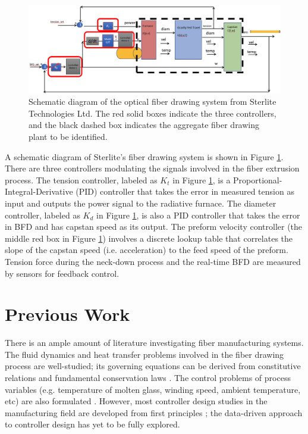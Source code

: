 \begin{figure}[ht!]
    \centering
    \includegraphics[width=\textwidth]{figures/stl_system_diag.png}
    \caption{Schematic diagram of the optical fiber drawing system from Sterlite Technologies Ltd. The red solid boxes indicate the three controllers, and the black dashed box indicates the aggregate fiber drawing plant to be identified.}
    \label{fig:stl_system_diag}
\end{figure}

A schematic diagram of Sterlite's fiber drawing system is shown in Figure \ref{fig:stl_system_diag}. There are three controllers modulating the signals involved in the fiber extrusion process. The tension controller, labeled as $K_t$ in Figure \ref{fig:stl_system_diag}, is a Proportional-Integral-Derivative (PID) controller that takes the error in measured tension as input and outputs the power signal to the radiative furnace. The diameter controller, labeled as $K_d$ in Figure \ref{fig:stl_system_diag}, is also a PID controller that takes the error in BFD and has capstan speed as its output. The preform velocity controller (the middle red box in Figure \ref{fig:stl_system_diag}) involves a discrete lookup table that correlates the slope of the capstan speed (i.e. acceleration) to the feed speed of the preform. Tension force during the neck-down process and the real-time BFD are measured by sensors for feedback control. 

\section{Previous Work}

There is an ample amount of literature investigating fiber manufacturing systems. The fluid dynamics and heat transfer problems involved in the fiber drawing process are well-studied; its governing equations can be derived from constitutive relations and fundamental conservation laws \cite{fiber_fluids1,fiber_fluids2,fiber_fluids3,fiber_fluids4}. The control problems of process variables (e.g. temperature of molten glass, winding speed, ambient temperature, etc) are also formulated \cite{fiber_ctrl1, fiber_ctrl2}. However, most controller design studies in the manufacturing field are developed from first principles \cite{manu_ctrl1, manu_ctrl2, manu_ctrl3}; the data-driven approach to controller design has yet to be fully explored. 

